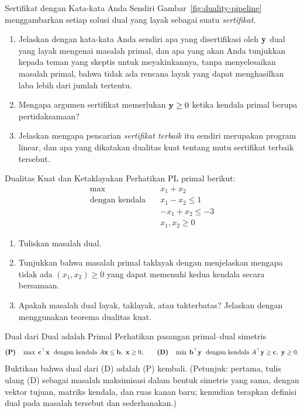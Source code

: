 \begin{ex}{Sertifikat dengan Kata-kata Anda Sendiri}{}
 Gambar~\ref{fig:duality-pipeline} menggambarkan setiap solusi dual yang layak sebagai suatu \emph{sertifikat}.
\begin{enumerate}
\item Jelaskan dengan kata-kata Anda sendiri apa yang disertifikasi oleh $\mathbf{y}$ dual yang layak mengenai masalah primal, dan apa yang akan Anda tunjukkan kepada teman yang skeptis untuk meyakinkannya, tanpa menyelesaikan masalah primal, bahwa tidak ada rencana layak yang dapat menghasilkan laba lebih dari jumlah tertentu.
\item Mengapa argumen sertifikat memerlukan $\mathbf{y} \geq 0$ ketika kendala primal berupa pertidaksamaan?
\item Jelaskan mengapa pencarian \emph{sertifikat terbaik} itu sendiri merupakan program linear, dan apa yang dikatakan dualitas kuat tentang mutu sertifikat terbaik tersebut.
\end{enumerate}
\end{ex}

\begin{ex}{Dualitas Kuat dan Ketaklayakan}{}
 Perhatikan PL primal berikut:
\[
\begin{aligned}
\max \quad & x_1 + x_2 \\
\text{dengan kendala} \quad & x_1 - x_2 \leq 1 \\
& -x_1 + x_2 \leq -3 \\
& x_1, x_2 \geq 0
\end{aligned}
\]
\begin{enumerate}
\item Tuliskan masalah dual.
\item Tunjukkan bahwa masalah primal taklayak dengan menjelaskan mengapa tidak ada $(x_1, x_2) \geq 0$ yang dapat memenuhi kedua kendala secara bersamaan.
\item Apakah masalah dual layak, taklayak, atau takterbatas? Jelaskan dengan menggunakan teorema dualitas kuat.
\end{enumerate}
\end{ex}


\begin{ex}{Dual dari Dual adalah Primal}{}
\label{ex:dual-of-dual}
 Perhatikan pasangan primal--dual simetris
\[
\textbf{(P)} \quad \max \; \c^\top \x \ \text{ dengan kendala } A\x \leq \b, \ \x \geq 0,
\qquad
\textbf{(D)} \quad \min \; \b^\top \y \ \text{ dengan kendala } A^\top \y \geq \c, \ \y \geq 0.
\]
Buktikan bahwa dual dari (D) adalah (P) kembali. (Petunjuk: pertama, tulis ulang (D) sebagai masalah maksimisasi dalam bentuk simetris yang sama, dengan vektor tujuan, matriks kendala, dan ruas kanan baru; kemudian terapkan definisi dual pada masalah tersebut dan sederhanakan.)
\exrefs{\S\ref{sec:duality-strong}, \S\ref{sec:duality-forms}}
\end{ex}

